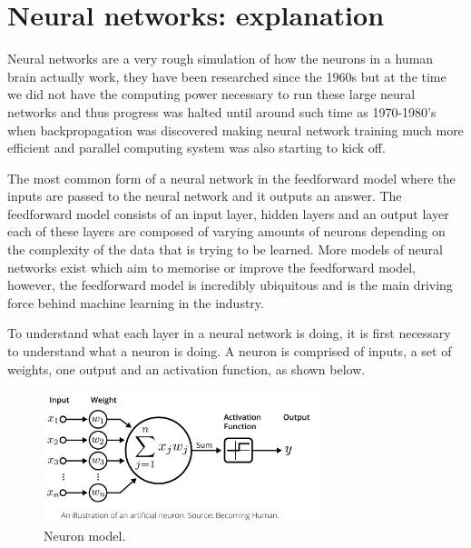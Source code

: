 \documentclass[a4paper,twoside,phd]{BYUPhys}
\begin{document}
\section{Neural networks: explanation}
Neural networks are a very rough simulation of how the neurons in a human brain actually work, they have been researched since the 1960s but at the time we did not have the computing power necessary to run these large neural networks and thus progress was halted until around such time as 1970-1980's when backpropagation was discovered making neural network training much more efficient and parallel computing system was also starting to kick off.

The most common form of a neural network in the feedforward model where the inputs are passed to the neural network and it outputs an answer. The feedforward model consists of an input layer, hidden layers and an output layer each of these layers are composed of varying amounts of neurons depending on the complexity of the data that is trying to be learned. More models of neural networks exist which aim to memorise or improve the feedforward model, however, the feedforward model is incredibly ubiquitous and is the main driving force behind machine learning in the industry. 

To understand what each layer in a neural network is doing, it is first necessary to understand what a neuron is doing. A neuron is comprised of inputs, a set of weights, one output and an activation function, as shown below.
\begin{figure}[H]
\centering
\includegraphics[width=8cm]{pictures/neuron_model.png}
\caption{Neuron model.}
\label{fig:neuron_model}
\end{figure}
\end{document}
